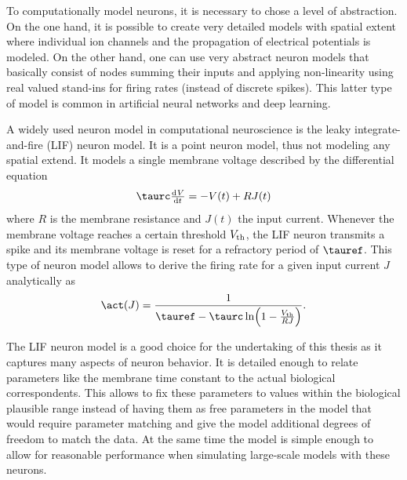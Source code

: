 To computationally model neurons, it is necessary to chose a level of abstraction.
On the one hand, it is possible to create very detailed models with spatial extent \parencite[e.g.,][]{markram2015,bahl2012} where individual ion channels and the propagation of electrical potentials is modeled.
On the other hand, one can use very abstract neuron models that basically consist of nodes summing their inputs and applying non-linearity using real valued stand-ins for firing rates (instead of discrete spikes).
This latter type of model is common in artificial neural networks and deep learning.

A widely used neuron model in computational neuroscience is the leaky integrate-and-fire (LIF) neuron model.
It is a point neuron model, thus not modeling any spatial extend.
It models a single membrane voltage described by the differential equation
\begin{equation}
    \taurc \od{V}{t} = -V(t) + R J(t)
\end{equation}
where $R$ is the membrane resistance and $J(t)$ the input current.
Whenever the membrane voltage reaches a certain threshold $V_{{\mathrm{th}}}$, the LIF neuron transmits a spike and its membrane voltage is reset for a refractory period of $\tauref$.
This type of neuron model allows to derive the firing rate for a given input current $J$ analytically as
\begin{equation}
    \act(J) = \frac{1}{\tauref - \taurc \ln\!\del{1 - \frac{V_{\ped{th}}}{R J}}} \text{.}
\end{equation}

The LIF neuron model is a good choice for the undertaking of this thesis as it captures many aspects of neuron behavior.
It is detailed enough to relate parameters like the membrane time constant to the actual biological correspondents.
This allows to fix these parameters to values within the biological plausible range instead of having them as free parameters in the model that would require parameter matching and give the model additional degrees of freedom to match the data.
At the same time the model is simple enough to allow for reasonable performance when simulating large-scale models with these neurons.
